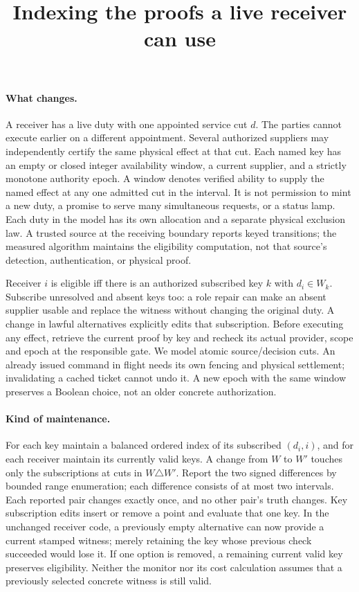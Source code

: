 \documentclass[11pt]{article}
\title{Indexing the proofs a live receiver can use}
\date{}
\begin{document}
\maketitle

\paragraph{What changes.}
A receiver has a live duty with one appointed service cut $d$. The parties cannot execute earlier on a different appointment. Several authorized suppliers may independently certify the same physical effect at that cut. Each named key has an empty or closed integer availability window, a current supplier, and a strictly monotone authority epoch. A window denotes verified ability to supply the named effect at any one admitted cut in the interval. It is not permission to mint a new duty, a promise to serve many simultaneous requests, or a status lamp. Each duty in the model has its own allocation and a separate physical exclusion law. A trusted source at the receiving boundary reports keyed transitions; the measured algorithm maintains the eligibility computation, not that source's detection, authentication, or physical proof.

Receiver $i$ is eligible iff there is an authorized subscribed key $k$ with $d_i\in W_k$. Subscribe unresolved and absent keys too: a role repair can make an absent supplier usable and replace the witness without changing the original duty. A change in lawful alternatives explicitly edits that subscription. Before executing any effect, retrieve the current proof by key and recheck its actual provider, scope and epoch at the responsible gate. We model atomic source/decision cuts. An already issued command in flight needs its own fencing and physical settlement; invalidating a cached ticket cannot undo it. A new epoch with the same window preserves a Boolean choice, not an older concrete authorization.

\paragraph{Kind of maintenance.}
For each key maintain a balanced ordered index of its subscribed $(d_i,i)$, and for each receiver maintain its currently valid keys. A change from $W$ to $W'$ touches only the subscriptions at cuts in $W\triangle W'$. Report the two signed differences by bounded range enumeration; each difference consists of at most two intervals. Each reported pair changes exactly once, and no other pair's truth changes. Key subscription edits insert or remove a point and evaluate that one key. In the unchanged receiver code, a previously empty alternative can now provide a current stamped witness; merely retaining the key whose previous check succeeded would lose it. If one option is removed, a remaining current valid key preserves eligibility. Neither the monitor nor its cost calculation assumes that a previously selected concrete witness is still valid.
\end{document}
